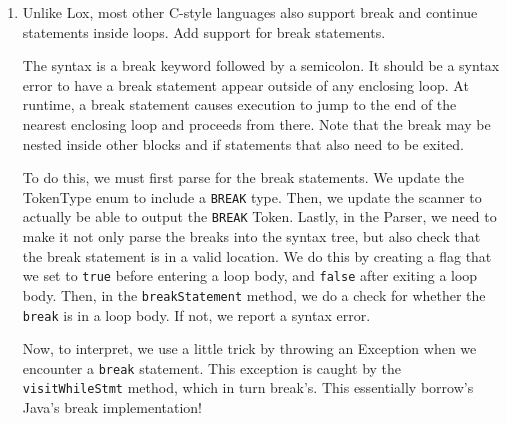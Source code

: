 \documentclass{article}
\begin{document}
\begin{enumerate}
{        So, we would implement a \verb|while| method that takes in two functions,
        a \verb|stmt| and \verb|nextCond|, which returns a boolean object. The 
        \verb|while| method will execute \verb|stmt|, and then evaluate 
        \verb|nextCond|. Then, we will call into the value returned by \verb|nextCond.while|.
        If \verb|nextCond| returns a Falsy object, we are done with the loop.

        One issue that can arise is stack usage because each recursive call 
        requires a new stack frame when implemented naively. However, we can 
        fix this by using Tail Recursion. When we make the recursive call as 
        the very last statement in a stack frame, we can actually overwrite the 
        stack frame in place, since we know we do not need the current frame's 
        data anymore. This way, we reduce our memory complexity from \(\mathcal{O}(n)\)
        to \(\mathcal{O}(1)\) where \(n\) is the number of interations.
    }

    \item {
        Unlike Lox, most other C-style languages also support break and continue statements inside loops. Add support for break statements.

        The syntax is a break keyword followed by a semicolon. It should be a syntax error to have a break statement appear outside of any enclosing loop. At runtime, a break statement causes execution to jump to the end of the nearest enclosing loop and proceeds from there. Note that the break may be nested inside other blocks and if statements that also need to be exited.

        To do this, we must first parse for the break statements.
        We update the TokenType enum to include a \verb|BREAK| type.
        Then, we update the scanner to actually be able to output the \verb|BREAK|
        Token. Lastly, in the Parser, we need to make it not only parse the breaks
        into the syntax tree, but also check that the break statement is in a valid 
        location. We do this by creating a flag that we set to \verb|true| before 
        entering a loop body, and \verb|false| after exiting a loop body.
        Then, in the \verb|breakStatement| method, we do a check for whether the 
        \verb|break| is in a loop body. If not, we report a syntax error.

        Now, to interpret, we use a little trick by throwing an Exception when 
        we encounter a \verb|break| statement. This exception is caught by
        the \verb|visitWhileStmt| method, which in turn break's. This essentially
        borrow's Java's break implementation!

}
\end{enumerate}
\end{document}

